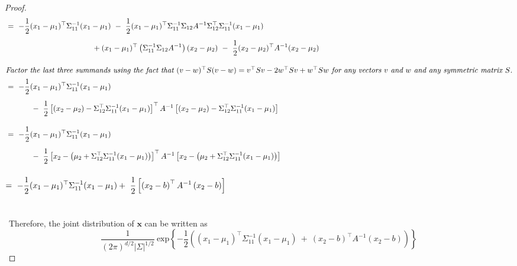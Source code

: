 \documentclass[twoside,11pt]{homework}
\DeclarePairedDelimiter{\2norm}{\lVert}{\rVert^2_2}
\newcommand{\1}[1]{\mathds{1}\left[#1\right]}
\begin{document}
\begin{proof}
\begin{align*}
& = \ -\frac{1}{2}(x_1 - \mu_1)^{\top}\Sigma_{11}^{-1}(x_1-\mu_1) \ - \ \frac{1}{2}(x_1 - \mu_1)^{\top}\Sigma_{11}^{-1}\Sigma_{12}A^{-1}\Sigma_{12}^{\top}\Sigma_{11}^{-1}(x_1-\mu_1) \\[0.5em]
&\quad \ \ \ \ \ \ \ \ \ \ \ \ \ \ \ \ \ \ \ \ \ \ \ \ \ \ \ \ \ \ \ + (x_1 - \mu_1)^{\top} \left(\Sigma_{11}^{-1}\Sigma_{12}A^{-1}\right)(x_2-\mu_2) \ - \ \frac{1}{2}(x_2 - \mu_2)^{\top}A^{-1}(x_2-\mu_2) \\[0.8em]
\intertext{\emph{Factor the last three summands using the fact that $(v-w)^{\top}S(v-w) = v^{\top}Sv - 2w^{\top}Sv + w^{\top}Sw$ for any vectors $v$ and $w$ and any symmetric matrix $S$.}} 
& = \ -\frac{1}{2}(x_1 - \mu_1)^{\top}\Sigma_{11}^{-1}(x_1-\mu_1) \\[0.5em]
&\quad \ \ \ \ \ \ \ - \ \frac{1}{2}\left[(x_2 - \mu_2) - \Sigma_{12}^{\top}\Sigma_{11}^{-1}(x_1-\mu_1) \right]^{\top} A^{-1} \left[(x_2 - \mu_2) - \Sigma_{12}^{\top}\Sigma_{11}^{-1}(x_1-\mu_1)\right] \\[1em]
& = \ -\frac{1}{2}(x_1 - \mu_1)^{\top}\Sigma_{11}^{-1}(x_1-\mu_1) \\[0.5em]
&\quad \ \ \ \ \ \ \ - \ \frac{1}{2}\left[x_2 - \left(\mu_2 + \Sigma_{12}^{\top}\Sigma_{11}^{-1}(x_1-\mu_1)\right)\right]^{\top} A^{-1} \left[x_2 - \left(\mu_2 + \Sigma_{12}^{\top}\Sigma_{11}^{-1}(x_1-\mu_1)\right)\right]  \\[1em]
\end{align*}
$ = \ \mathlarger{-\frac{1}{2}(x_1 - \mu_1)^{\top}\Sigma_{11}^{-1}(x_1-\mu_1) + \ \frac{1}{2}\left[\left(x_2 - b \right)^{\top} A^{-1} \left(x_2 - b \right)  \right]}$\\\ \\\ \\\
Therefore, the joint distribution of $\textbf{x}$ can be written as 
$$ \frac{1}{(2\pi)^{d/2}|\Sigma|^{1/2}} \ \text{exp} \left\lbrace -\frac{1}{2}\left((x_1 - \mu_1)^{\top}\Sigma_{11}^{-1}(x_1-\mu_1) \ + \ \left(x_2 - b \right)^{\top} A^{-1} \left(x_2 - b \right)\right) \right\rbrace$$
\end{proof}
\vspace{0.1in}
\end{document}
